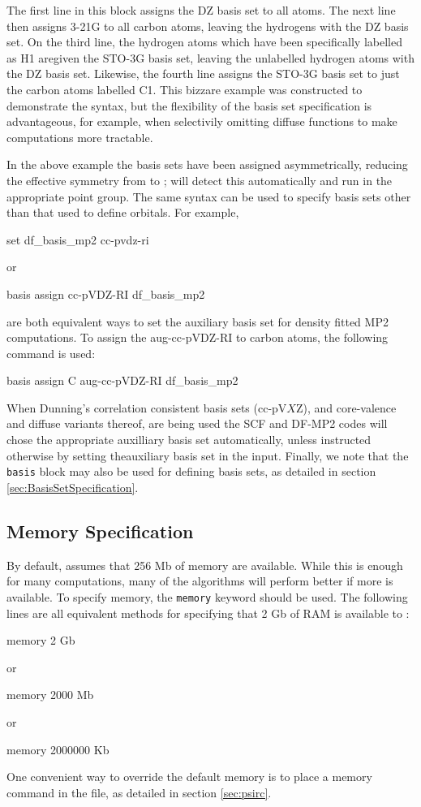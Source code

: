 The first line in this block assigns the DZ basis set to all atoms.  The next
line then assigns 3-21G to all carbon atoms, leaving the hydrogens with the DZ
basis set.  On the third line, the hydrogen atoms which have been specifically
labelled as H1 aregiven the STO-3G basis set, leaving the unlabelled hydrogen
atoms with the DZ basis set.  Likewise, the fourth line assigns the STO-3G
basis set to just the carbon atoms labelled C1.  This bizzare example was
constructed to demonstrate the syntax, but the flexibility of the basis set
specification is advantageous, for example, when selectivily omitting diffuse
functions to make computations more tractable.

In the above example the basis sets have been assigned asymmetrically, reducing
the effective symmetry from  to ; \PSIfour will detect this
automatically and run in the appropriate point group.  The same syntax can be
used to specify basis sets other than that used to define orbitals.  For
example, 

\begin{Snippet}
set df_basis_mp2 cc-pvdz-ri

 or

basis {
   assign cc-pVDZ-RI df_basis_mp2
}
\end{Snippet}
are both equivalent ways to set the auxiliary basis set for density fitted MP2
computations.  To assign the aug-cc-pVDZ-RI to carbon atoms, the following
command is used:
\begin{Snippet}
basis {
   assign C aug-cc-pVDZ-RI df_basis_mp2
}
\end{Snippet}

When Dunning's correlation consistent basis sets (cc-pV$X$Z), and core-valence
and diffuse variants thereof, are being used the SCF and DF-MP2 codes will
chose the appropriate auxilliary basis set automatically, unless instructed
otherwise by setting theauxiliary basis set in the input.  Finally, we note
that the {\tt basis} block may also be used for defining basis sets, as
detailed in section \ref{sec:BasisSetSpecification}.

\subsection{Memory Specification}
By default, \PSIfour assumes that 256 Mb of memory are available. While this is
enough for many computations, many of the algorithms will perform better if
more is available. To specify memory, the {\tt memory} keyword should be used. The following
lines are all equivalent methods for specifying that 2 Gb of RAM is available
to \PSIfour:
\begin{Snippet}
memory 2 Gb

 or

memory 2000 Mb

 or

memory 2000000 Kb
\end{Snippet}
One convenient way to override the \PSIfour default memory is to place a memory
command in the \psirc file, as detailed in section \ref{sec:psirc}.

